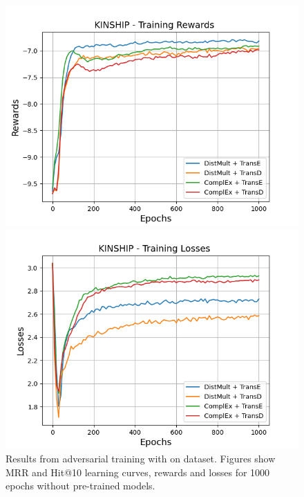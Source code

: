 \begin{figure}[H]
    \begin{minipage}{.45\textwidth}
      \centering
      \includegraphics[width=0.9\linewidth]{figures/results/gan_train/not_pretrained/random/kinship/1k_epochs/random_kinship_rew.png}
    \end{minipage}%
     \begin{minipage}{.45\textwidth}
      \centering
      \includegraphics[width=0.9\linewidth]{figures/results/gan_train/not_pretrained/random/kinship/1k_epochs/random_kinship_losses.png}
    \end{minipage}%
    \caption{Results from adversarial training with \origsampling on \kinship dataset.
    Figures show MRR and Hit@10 learning curves, rewards and losses for 1000 epochs without pre-trained models.}
    \label{fig:gan_train_not_pretrained_random_kinship}
\end{figure}
